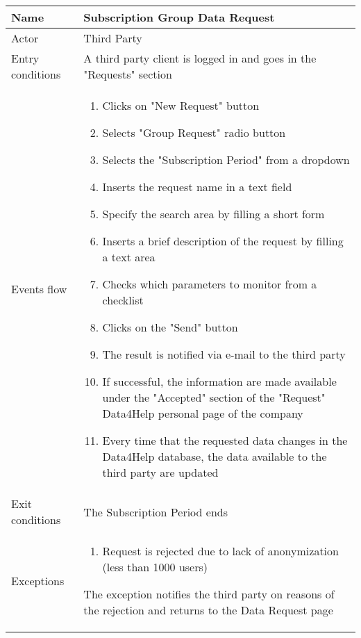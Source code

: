 \newpage
\begin{table}[h!]
\begin{tabular}{|l|p{12cm}|}
\hline
Name             & Subscription Group Data Request \\ \hline
Actor            & Third Party \\ \hline
Entry conditions & A third party client is logged in and goes in the "Requests" section\\ \hline
Events flow      & \begin{enumerate}
\item Clicks on "New Request" button
\item Selects "Group Request" radio button
\item Selects the "Subscription Period" from a dropdown
\item Inserts the request name in a text field
\item Specify the search area by filling a short form
\item Inserts a brief description of the request by filling a text area
\item Checks which parameters to monitor from a checklist
\item Clicks on the "Send" button
\item The result is notified via e-mail to the third party
\item If successful, the information are made available under the "Accepted" 
section of the "Request" Data4Help personal page of the company
\item Every time that the requested data changes in the Data4Help database, 
the data available to the third party are updated
\end{enumerate} \\ \hline
Exit conditions  & The Subscription Period ends \\ \hline
Exceptions      & \begin{enumerate}
\item Request is rejected due to lack of anonymization (less than 1000 users)
\end{enumerate} The exception notifies the third party on reasons of the rejection 
and returns to the Data Request page\\ \hline
\end{tabular}
\end{table}

